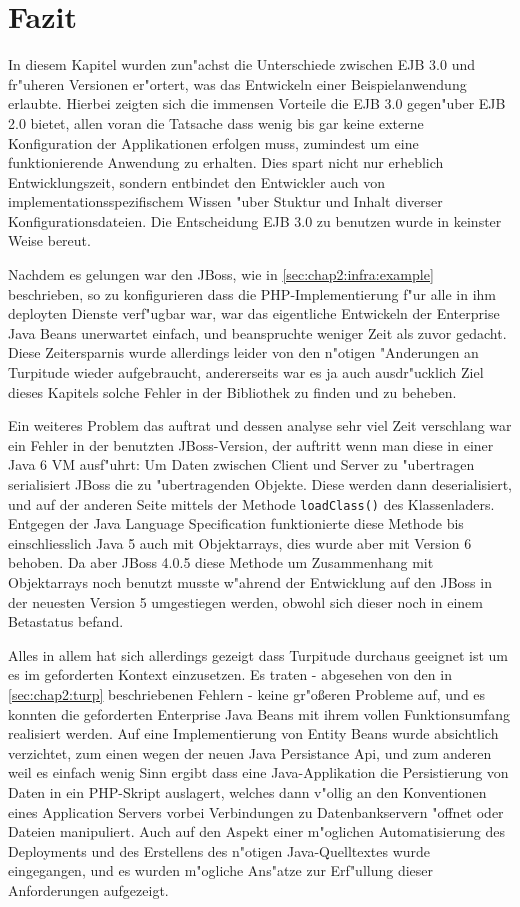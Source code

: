 \section{Fazit}
\label{sec:chap2:fazit}

In diesem Kapitel wurden zun"achst die Unterschiede zwischen EJB 3.0 und fr"uheren Versionen er"ortert, was
das Entwickeln einer Beispielanwendung erlaubte. Hierbei zeigten sich die immensen Vorteile die EJB 3.0 gegen"uber
EJB 2.0 bietet, allen voran die Tatsache dass wenig bis gar keine externe Konfiguration der Applikationen erfolgen
muss, zumindest um eine funktionierende Anwendung zu erhalten. Dies spart nicht nur erheblich Entwicklungszeit,
sondern entbindet den Entwickler auch von implementationsspezifischem Wissen "uber Stuktur und Inhalt diverser
Konfigurationsdateien. Die Entscheidung EJB 3.0 zu benutzen wurde in keinster Weise bereut.

Nachdem es gelungen war den JBoss, wie in \ref{sec:chap2:infra:example} beschrieben, so zu konfigurieren dass
die PHP-Implementierung f"ur alle in ihm deployten Dienste verf"ugbar war, war das eigentliche Entwickeln der
Enterprise Java Beans unerwartet einfach, und beanspruchte weniger Zeit als zuvor gedacht. Diese Zeitersparnis
wurde allerdings leider von den n"otigen "Anderungen an Turpitude wieder aufgebraucht, andererseits war
es ja auch ausdr"ucklich Ziel dieses Kapitels solche Fehler in der Bibliothek zu finden und zu beheben.

Ein weiteres Problem das auftrat und dessen analyse sehr viel Zeit verschlang war ein Fehler in der benutzten JBoss-Version, 
der auftritt wenn man diese in einer Java 6 VM ausf"uhrt:
Um Daten zwischen Client und Server zu "ubertragen serialisiert JBoss die zu "ubertragenden Objekte. Diese
werden dann deserialisiert, und auf der anderen Seite mittels der Methode \texttt{loadClass()} des Klassenladers.
Entgegen der Java Language Specification funktionierte diese Methode bis einschliesslich Java 5 auch mit Objektarrays,
dies wurde aber mit Version 6 behoben. Da aber JBoss 4.0.5 diese Methode um Zusammenhang mit Objektarrays noch benutzt
musste w"ahrend der Entwicklung auf den JBoss in der neuesten Version 5 umgestiegen werden, obwohl sich dieser noch
in einem Betastatus befand.

Alles in allem hat sich allerdings gezeigt dass Turpitude durchaus geeignet ist um es im geforderten Kontext
einzusetzen. Es traten - abgesehen von den in \ref{sec:chap2:turp} beschriebenen Fehlern - keine gr"o\ss eren Probleme
auf, und es konnten die geforderten Enterprise Java Beans mit ihrem vollen Funktionsumfang realisiert werden.
Auf eine Implementierung von Entity Beans wurde absichtlich verzichtet, zum einen wegen der neuen Java Persistance Api,
und zum anderen weil es einfach wenig Sinn ergibt dass eine Java-Applikation die Persistierung von Daten in ein
PHP-Skript auslagert, welches dann v"ollig an den Konventionen eines Application Servers vorbei Verbindungen zu Datenbankservern
"offnet oder Dateien manipuliert.
Auch auf den Aspekt einer m"oglichen Automatisierung des Deployments und des Erstellens des n"otigen Java-Quelltextes
wurde eingegangen, und es wurden m"ogliche Ans"atze zur Erf"ullung dieser Anforderungen aufgezeigt.

